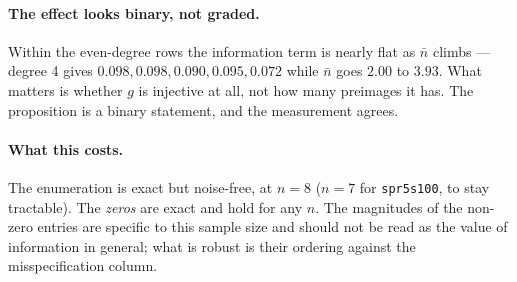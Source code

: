 \paragraph{The effect looks binary, not graded.} Within the even-degree rows
the information term is nearly flat as $\bar n$ climbs --- degree 4 gives
$0.098, 0.098, 0.090, 0.095, 0.072$ while $\bar n$ goes $2.00$ to $3.93$. What
matters is whether $g$ is injective at all, not how many preimages it has. The
proposition is a binary statement, and the measurement agrees.

\paragraph{What this costs.} The enumeration is exact but noise-free, at
$n=8$ ($n=7$ for \texttt{spr5s100}, to stay tractable). The \emph{zeros} are
exact and hold for any $n$. The magnitudes of the non-zero entries are
specific to this sample size and should not be read as the value of
information in general; what is robust is their ordering against the
misspecification column.
